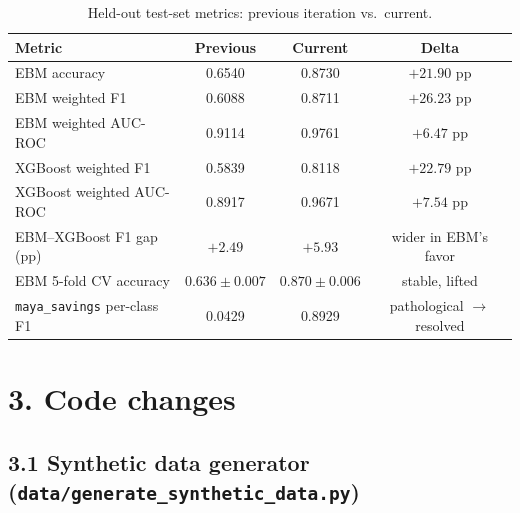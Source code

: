 \documentclass[11pt,a4paper]{article}
\begin{document}
\begin{table}[h]
    \centering
    \small
    \caption{Held-out test-set metrics: previous iteration vs.\ current.}
    \begin{tabular}{lccc}
        \toprule
        \textbf{Metric} & \textbf{Previous} & \textbf{Current} & \textbf{Delta} \\
        \midrule
        EBM accuracy                  & 0.6540 & 0.8730 & $+21.90$ pp \\
        EBM weighted F1               & 0.6088 & 0.8711 & $+26.23$ pp \\
        EBM weighted AUC-ROC          & 0.9114 & 0.9761 & $+6.47$ pp  \\
        XGBoost weighted F1           & 0.5839 & 0.8118 & $+22.79$ pp \\
        XGBoost weighted AUC-ROC      & 0.8917 & 0.9671 & $+7.54$ pp  \\
        EBM--XGBoost F1 gap (pp)      & $+2.49$ & $+5.93$ & wider in EBM's favor \\
        EBM 5-fold CV accuracy        & $0.636 \pm 0.007$ & $0.870 \pm 0.006$ & stable, lifted \\
        \texttt{maya\_savings} per-class F1 & 0.0429 & 0.8929 & pathological $\to$ resolved \\
        \bottomrule
    \end{tabular}
\end{table}

\section*{3. Code changes}

\subsection*{3.1 Synthetic data generator (\texttt{data/generate\_synthetic\_data.py})}
\end{document}
